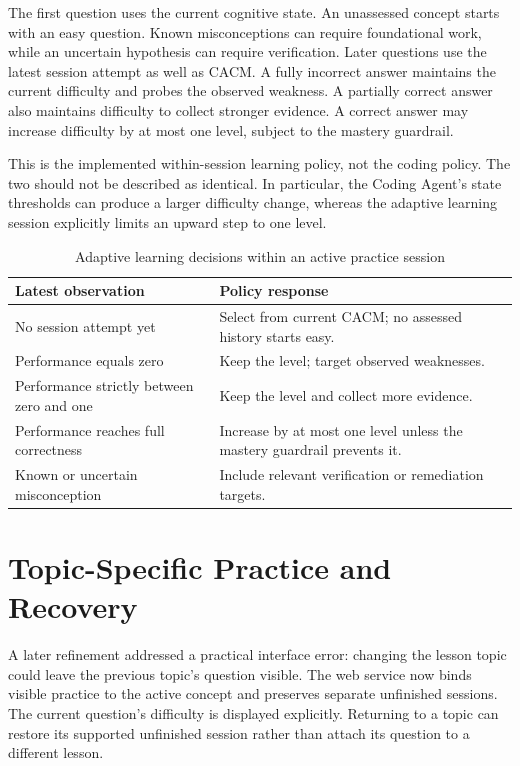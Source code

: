 The first question uses the current cognitive state. An unassessed concept starts with an easy question. Known misconceptions can require foundational work, while an uncertain hypothesis can require verification. Later questions use the latest session attempt as well as CACM. A fully incorrect answer maintains the current difficulty and probes the observed weakness. A partially correct answer also maintains difficulty to collect stronger evidence. A correct answer may increase difficulty by at most one level, subject to the mastery guardrail.

This is the implemented within-session learning policy, not the coding policy. The two should not be described as identical. In particular, the Coding Agent's state thresholds can produce a larger difficulty change, whereas the adaptive learning session explicitly limits an upward step to one level.

\begin{table}[htbp]\centering\small
\caption{Adaptive learning decisions within an active practice session}\label{tab:learning-policy}
\begin{tabular}{P{0.37\textwidth}P{0.54\textwidth}}\toprule
Latest observation & Policy response\\\midrule
No session attempt yet & Select from current CACM; no assessed history starts easy.\\
Performance equals zero & Keep the level; target observed weaknesses.\\
Performance strictly between zero and one & Keep the level and collect more evidence.\\
Performance reaches full correctness & Increase by at most one level unless the mastery guardrail prevents it.\\
Known or uncertain misconception & Include relevant verification or remediation targets.\\\bottomrule
\end{tabular}
\end{table}

\section{Topic-Specific Practice and Recovery}
A later refinement addressed a practical interface error: changing the lesson topic could leave the previous topic's question visible. The web service now binds visible practice to the active concept and preserves separate unfinished sessions. The current question's difficulty is displayed explicitly. Returning to a topic can restore its supported unfinished session rather than attach its question to a different lesson.

